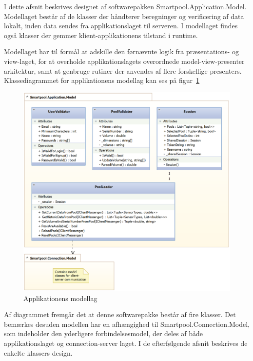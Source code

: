 I dette afsnit beskrives designet af softwarepakken Smartpool.Application.Model. Modellaget består af de klasser der håndterer beregninger og verificering af data lokalt, inden data sendes fra applikationslaget til serveren. I modellaget findes også klasser der gemmer klient-applikationens tilstand i runtime.

Modellaget har til formål at adskille den førnævnte logik fra præsentations- og view-laget, for at overholde applikationslagets overordnede model-view-presenter arkitektur, samt at genbruge rutiner der anvendes af flere forskellige presenters. Klassediagrammet for applikationens modellag kan ses på figur~\ref{fig:application_model_cd}

\begin{figure}
	\centering
	\includegraphics[width=1.0\linewidth]{figs/design/application_model_cd}
	\caption{Applikationens modellag}
	\label{fig:application_model_cd}
\end{figure}

Af diagrammet fremgår det at denne softwarepakke består af fire klasser. Det bemærkes desuden modellen har en afhængighed til Smartpool.Connection.Model, som indeholder den yderligere forbindelsesmodel, der deles af både applikationslaget og connection-server laget. I de efterfølgende afsnit beskrives de enkelte klassers design.

